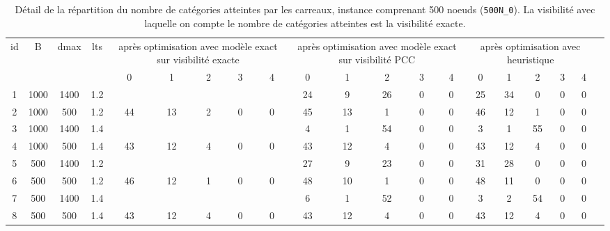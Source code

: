 \begin{sidewaystable}
    \vspace{2\baselineskip}
    \caption{Détail de la répartition du nombre de catégories atteintes par les carreaux, instance comprenant 500 noeuds (\texttt{500N\_0}). La visibilité avec laquelle on compte le nombre de catégories atteintes est la visibilité exacte.}
    \label{tab:500div_detail}
    \begin{tabular}{|c|c|c|c|c|c|c|c|c|c|c|c|c|c|c|c|c|c|c|c|}
    \hline
    id & B & dmax & lts & \multicolumn{5}{p{2cm}|}{après optimisation avec modèle exact sur visibilité exacte} & \multicolumn{5}{p{2cm}|}{après optimisation avec modèle exact sur visibilité PCC} & \multicolumn{5}{p{2cm}|}{après optimisation avec heuristique} \\
    \cline{5-19}
    &  &  &  & 0 & 1 & 2 & 3 & 4 & 0 & 1 & 2 & 3 & 4 & 0 & 1 & 2 & 3 & 4 \\
    \hline
    1 & 1000 & 1400 & 1.2 &  &  &  &  &  & 24 & 9 & 26 & 0 & 0 & 25 & 34 & 0 & 0 & 0 \\
    2 & 1000 & 500 & 1.2 & 44 & 13 & 2 & 0 & 0 & 45 & 13 & 1 & 0 & 0 & 46 & 12 & 1 & 0 & 0 \\
    3 & 1000 & 1400 & 1.4 &  &  &  &  &  & 4 & 1 & 54 & 0 & 0 & 3 & 1 & 55 & 0 & 0 \\
    4 & 1000 & 500 & 1.4 & 43 & 12 & 4 & 0 & 0 & 43 & 12 & 4 & 0 & 0 & 43 & 12 & 4 & 0 & 0 \\
    5 & 500 & 1400 & 1.2 &  &  &  &  &  & 27 & 9 & 23 & 0 & 0 & 31 & 28 & 0 & 0 & 0 \\
    6 & 500 & 500 & 1.2 & 46 & 12 & 1 & 0 & 0 & 48 & 10 & 1 & 0 & 0 & 48 & 11 & 0 & 0 & 0 \\
    7 & 500 & 1400 & 1.4 &  &  &  &  &  & 6 & 1 & 52 & 0 & 0 & 3 & 2 & 54 & 0 & 0 \\
    8 & 500 & 500 & 1.4 & 43 & 12 & 4 & 0 & 0 & 43 & 12 & 4 & 0 & 0 & 43 & 12 & 4 & 0 & 0 \\
    \hline
    \end{tabular}
\end{sidewaystable}



